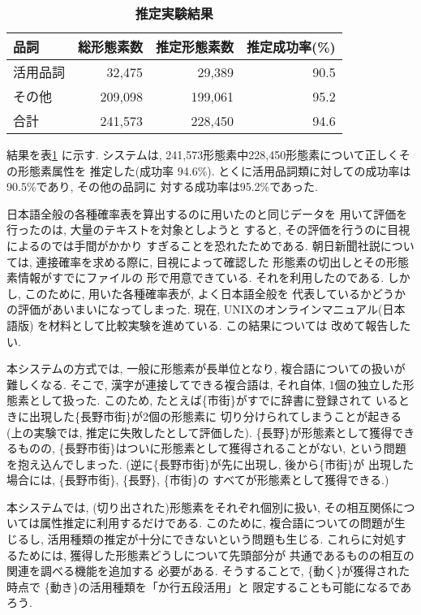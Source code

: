 \begin{table}
\begin{center}
 \caption{\bf 推定実験結果}
 \label{tab:exp_result}
 \begin{tabular}{l|r|r|r} \hline \hline
   {品詞}   & \multicolumn{1}{c|}{総形態素数}
            & \multicolumn{1}{c|}{推定形態素数}
            & \multicolumn{1}{c}{推定成功率(\%)} \\  \hline 
   活用品詞 &  32,475 &  29,389 & 90.5\\ \hline
   その他   & 209,098 & 199,061 & 95.2\\ \hline
   合計     & 241,573 & 228,450 & 94.6\\
   \hline
 \end{tabular}
\end{center}
\end{table}
結果を表\ref{tab:exp_result} に示す. 
システムは, 241,573形態素中228,450形態素について正しくその形態素属性を
推定した(成功率 94.6\%). 
とくに活用品詞類に対しての成功率は90.5\%であり, その他の品詞に
対する成功率は95.2\%であった. 

日本語全般の各種確率表を算出するのに用いたのと同じデータを
用いて評価を行ったのは, 大量のテキストを対象としようと
すると, その評価を行うのに目視によるのでは手間がかかり
すぎることを恐れたためである. 朝日新聞社説については, 
連接確率を求める際に, 目視によって確認した
形態素の切出しとその形態素情報がすでにファイルの
形で用意できている. それを利用したのである. 
しかし, このために, 用いた各種確率表が, よく日本語全般を
代表しているかどうかの評価があいまいになってしまった. 
現在, UNIXのオンラインマニュアル(日本語版)
を材料として比較実験を進めている. この結果については
改めて報告したい. 

本システムの方式では, 一般に形態素が長単位となり, 
複合語についての扱いが難しくなる. 
そこで, 漢字が連接してできる複合語は, それ自体, 
1個の独立した形態素として扱った.  
このため, たとえば\{市街\}がすでに辞書に登録されて
いるときに出現した\{長野市街\}が2個の形態素に
切り分けられてしまうことが起きる
(上の実験では, 推定に失敗したとして評価した).
\{長野\}が形態素として獲得できるものの,
\{長野市街\}はついに形態素として獲得されることがない, 
という問題を抱え込んでしまった. 
(逆に\{長野市街\}が先に出現し, 後から\{市街\}が
出現した場合には, \{長野市街\}, \{長野\}, \{市街\}の
すべてが形態素として獲得できる.) 
  
本システムでは, 
(切り出された)形態素をそれぞれ個別に扱い, 
その相互関係については属性推定に利用するだけである.  
このために, 複合語についての問題が生じるし, 
活用種類の推定が十分にできないという問題も生じる. 
これらに対処するためには, 
獲得した形態素どうしについて先頭部分が
共通であるものの相互の関連を調べる機能を追加する
必要がある.  そうすることで, 
\{動く\}が獲得された時点で
\{動き\}の活用種類を「か行五段活用」と
限定することも可能になるであろう. 

